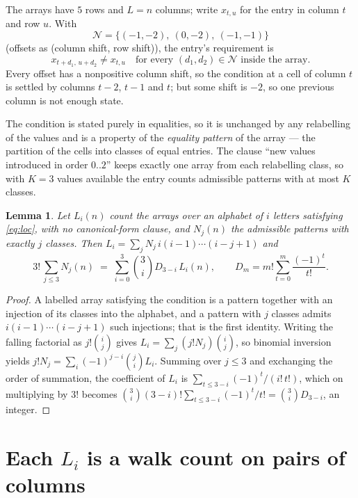 \documentclass[11pt,a4paper]{article}
\theoremstyle{plain}
\newtheorem{lemma}[theorem]{Lemma}
\theoremstyle{definition}
\begin{document}
The arrays have $5$ rows and $L=n$ columns; write $x_{t,u}$ for the entry in
column $t$ and row $u$. With
\[
\mathcal N=\{(-1,-2),\ (0,-2),\ (-1,-1)\}
\]
(offsets as (column shift, row shift)), the entry's requirement is
\begin{equation}\label{eq:loc}
x_{t+d_1,\,u+d_2}\ne x_{t,u}\quad\text{for every }(d_1,d_2)\in\mathcal N\text{ inside the array}.
\end{equation}
Every offset has a nonpositive column shift, so the condition at a cell of column $t$ is
settled by columns $t-2$, $t-1$ and $t$; but some shift is $-2$, so one previous column is not
enough state.

The condition is stated purely in equalities, so it is unchanged by any relabelling of the
values and is a property of the \emph{equality pattern} of the array --- the partition of
the cells into classes of equal entries. The clause ``new values introduced in order
$0..2$'' keeps exactly one array from each relabelling class, so with $K=3$ values
available the entry counts admissible patterns with at most $K$ classes.

\begin{lemma}\label{lem:inv}
Let $L_i(n)$ count the arrays over an alphabet of $i$ letters satisfying \eqref{eq:loc},
with no canonical-form clause, and $N_j(n)$ the admissible patterns with exactly $j$ classes.
Then $L_i=\sum_j N_j\,i(i-1)\cdots(i-j+1)$ and
\[
3!\,\sum_{j\le 3}N_j(n)\;=\;\sum_{i=0}^{3}\binom{3}{i}D_{3-i}\,L_i(n),
\qquad D_m=m!\sum_{t=0}^{m}\frac{(-1)^t}{t!} .
\]
\end{lemma}

\begin{proof}
A labelled array satisfying the condition is a pattern together with an injection of its
classes into the alphabet, and a pattern with $j$ classes admits $i(i-1)\cdots(i-j+1)$ such
injections; that is the first identity. Writing the falling factorial as $j!\binom{i}{j}$
gives $L_i=\sum_j(j!N_j)\binom{i}{j}$, so binomial inversion yields
$j!N_j=\sum_i(-1)^{j-i}\binom{j}{i}L_i$. Summing over $j\le3$ and exchanging the
order of summation, the coefficient of $L_i$ is $\sum_{t\le3-i}(-1)^t/(i!\,t!)$, which on
multiplying by $3!$ becomes
$\binom{3}{i}(3-i)!\sum_{t\le3-i}(-1)^t/t!=\binom{3}{i}D_{3-i}$, an
integer.
\end{proof}

\section{Each $L_i$ is a walk count on pairs of columns}
\end{document}
